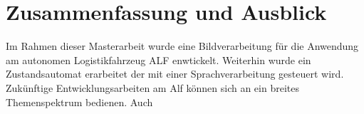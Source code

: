 \chapter{Zusammenfassung und Ausblick}
\label{Fazit und Ausblick}
	
Im Rahmen dieser Masterarbeit wurde eine Bildverarbeitung für die Anwendung am autonomen Logistikfahrzeug ALF enwtickelt. Weiterhin wurde ein Zustandsautomat erarbeitet der mit einer Sprachverarbeitung gesteuert wird. \\

Zukünftige Entwicklungsarbeiten am Alf können sich an ein breites Themenspektrum bedienen. Auch  





